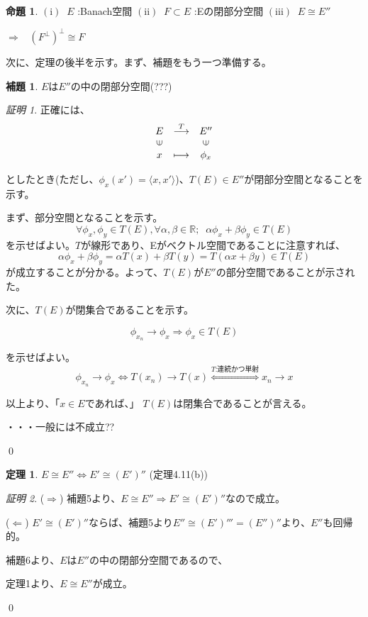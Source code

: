 \documentclass[11pt,a4paper]{amsart}
\theoremstyle{definition}
\newtheorem{thm}{定理}
\newtheorem{lem}{補題}
\newtheorem{prop}{命題}
\theoremstyle{definition}
\theoremstyle{remark}
\newtheorem{prf}{証明}
\begin{document}
\begin{prop}
$\mathrm{(i)}\;\; E$ :Banach空間 \;\;\;
$\mathrm{(ii)}\;\; F \subset E$ :Eの閉部分空間  \;\;\;
$\mathrm{(iii)}\;\; E \cong E''$ \;\;\;

$\Longrightarrow \;\;\; (F^\bot)^\bot \cong F$
\end{prop}

次に、定理の後半を示す。まず、補題をもう一つ準備する。

\begin{lem}
$E$は$E''$の中の閉部分空間(???)
\end{lem}

\begin{prf}
正確には、
$$
\begin{array}{ccc}
E & \stackrel{T}{\longrightarrow} & E'' \\
\rotatebox{90}{$\in$} & & \rotatebox{90}{$\in$} \\
x & \longmapsto & \phi_x
\end{array}
$$

としたとき(ただし、$\phi_x(x') = \langle x,x' \rangle $)、$T(E) \in E''$が閉部分空間となることを示す。

まず、部分空間となることを示す。
$$
\forall \phi_x, \phi_y \in T(E),\forall \alpha, \beta \in \mathbb{R}; \;\; \alpha \phi_x + \beta \phi_y \in T(E) 
$$
を示せばよい。$T$が線形であり、Eがベクトル空間であることに注意すれば、
$$
\alpha \phi_x + \beta \phi_y
=\alpha T(x) + \beta T(y)
=T(\alpha x + \beta y) \in T(E)$$
が成立することが分かる。よって、$T(E)$が$E''$の部分空間であることが示された。

次に、$T(E)$が閉集合であることを示す。

$$\phi_{x_n} \to \phi_x \Longrightarrow \phi_x \in T(E)$$

を示せばよい。
$$
\phi_{x_n} \to \phi_x
\Longleftrightarrow T(x_n) \to T(x)
\overset{\textrm{$T$:連続かつ単射}}{\Longleftrightarrow} x_n \to x
$$

以上より、「$x \in E$であれば、」 $T(E)$は閉集合であることが言える。

・・・一般には不成立??

\qed
\end{prf}

\begin{thm}
$E \cong E'' \Longleftrightarrow E' \cong (E')''$ (定理4.11(b))
\end{thm}

\begin{prf}

($\Longrightarrow$) 補題5より、$E \cong E'' \Longrightarrow E' \cong (E')''$なので成立。

($\Longleftarrow$) $E' \cong (E')''$ならば、補題5より$E'' \cong (E')''' = (E'')''$より、$E''$も回帰的。

補題6より、$E$は$E''$の中の閉部分空間であるので、

定理1より、$E \cong E''$が成立。

\qed
\end{prf}
\end{document}

